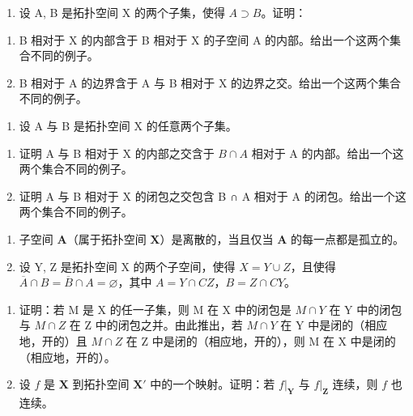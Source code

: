 \BourbakiExerciseGroup

\begin{enumerate}
\def\labelenumi{\arabic{enumi})}
\tightlist
\item
  设 A, B 是拓扑空间 X 的两个子集，使得 \(A \supset B\)。证明：
\end{enumerate}

\begin{enumerate}
\def\labelenumi{\alph{enumi})}
\item
  B 相对于 X 的内部含于 B 相对于 X 的子空间 A 的内部。给出一个这两个集合不同的例子。
\item
  B 相对于 A 的边界含于 A 与 B 相对于 X 的边界之交。给出一个这两个集合不同的例子。
\end{enumerate}

\begin{enumerate}
\def\labelenumi{\arabic{enumi})}
\setcounter{enumi}{1}
\tightlist
\item
  设 A 与 B 是拓扑空间 X 的任意两个子集。
\end{enumerate}

\begin{enumerate}
\def\labelenumi{\alph{enumi})}
\item
  证明 A 与 B 相对于 X 的内部之交含于 \(B \cap A\) 相对于 A 的内部。给出一个这两个集合不同的例子。
\item
  证明 A 与 B 相对于 X 的闭包之交包含 B ∩ A 相对于 A 的闭包。给出一个这两个集合不同的例子。
\end{enumerate}

\begin{enumerate}
\def\labelenumi{\arabic{enumi})}
\setcounter{enumi}{2}
\item
  子空间 \(\mathbf{A}\)（属于拓扑空间 \(\mathbf{X}\)）是离散的，当且仅当 \(\mathbf{A}\) 的每一点都是孤立的。
\item
  设 Y, Z 是拓扑空间 X 的两个子空间，使得 \(X = Y \cup Z\)，且使得 \(\overline{A} \cap B = \overline{B} \cap A = \varnothing\)，其中 \(A = Y \cap CZ\)，\(B = Z \cap CY\)。
\end{enumerate}

\begin{enumerate}
\def\labelenumi{\alph{enumi})}
\item
  证明：若 M 是 X 的任一子集，则 M 在 X 中的闭包是 \(M \cap Y\) 在 Y 中的闭包与 \(M \cap Z\) 在 Z 中的闭包之并。由此推出，若 \(M \cap Y\) 在 Y 中是闭的（相应地，开的）且 \(M \cap Z\) 在 Z 中是闭的（相应地，开的），则 M 在 X 中是闭的（相应地，开的）。
\item
  设 \(f\) 是 \(\mathbf{X}\) 到拓扑空间 \(\mathbf{X}'\) 中的一个映射。证明：若 \(f|_{\mathbf{Y}}\) 与 \(f|_{\mathbf{Z}}\) 连续，则 \(f\) 也连续。
\end{enumerate}

